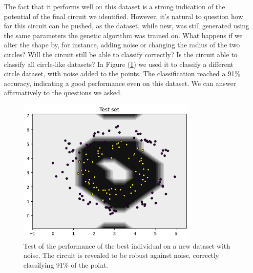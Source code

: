 \documentclass[12pt]{article}
\begin{document}
The fact that it performs well on this dataset is a strong indication of the potential of the final circuit we identified. However, it's natural to question how far this circuit can be pushed, as the dataset, while new, was still generated using the same parameters the genetic algorithm was trained on. What happens if we alter the shape by, for instance, adding noise or changing the radius of the two circles? Will the circuit still be able to classify correctly? Is the circuit able to classify all circle-like datasets? In Figure (\ref{fig:noise}) we used it to classify a different circle dataset, with noise added to the points. The classification reached a 91\% accuracy, indicating a good performance even on this dataset. We can answer affirmatively to the questions we asked.  
\begin{figure}[h!]
    \centering
    \includegraphics[width=0.8\textwidth]{images/noise.png}
    \caption{Test of the performance of the best individual on a new dataset with noise. The circuit is revealed to be robust against noise, correctly classifying 91\% of the point.}
    \label{fig:noise}
\end{figure}
\end{document}
